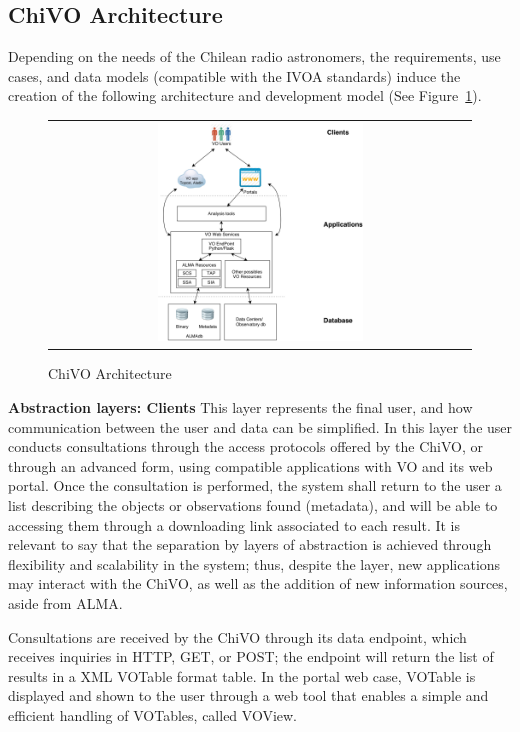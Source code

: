 \documentclass[]{spie}
\begin{document}
\subsection{ChiVO Architecture}
Depending on the needs of the Chilean radio astronomers, the requirements, use cases, and data models (compatible with the IVOA standards) induce the creation of the following architecture and development model (See Figure~\ref{fig:chivoarch}).

\begin{figure}
   \begin{center}
   \begin{tabular}{c}
   \includegraphics[width=0.5\textwidth]{images/chivo_capas.png}
   \end{tabular}
   \end{center}
   \caption[example]
   { \label{fig:chivoarch} ChiVO Architecture}
\end{figure}

\textbf{Abstraction layers:  Clients}
This layer represents the final user, and how communication between the user and data can be simplified.  In this layer the user conducts consultations through the access protocols offered by the ChiVO, or through an advanced form, using compatible applications with VO and its web portal.  Once the consultation is performed, the system shall return to the user a list describing the objects or observations found (metadata), and will be able to accessing them through a downloading link associated to each result.  It is relevant to say that the separation by layers of abstraction is achieved through flexibility and scalability in the system; thus, despite the layer, new applications may interact with the ChiVO, as well as the addition of new information sources, aside from ALMA.

Consultations are received by the ChiVO through its data endpoint, which receives inquiries in HTTP, GET, or POST; the endpoint will return the list of results in a XML VOTable \cite{ochsenbein2011ivoa} format table.  In the portal web case, VOTable is displayed and shown to the user through a web tool that enables a simple and efficient handling of VOTables, called VOView.
\end{document}
